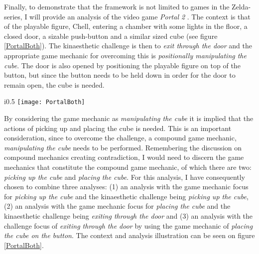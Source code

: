Finally, to demonstrate that the framework is not limited to games in the Zelda-series, I will provide an analysis of the video game \textit{Portal 2} \cite{portaltwo}. The context is that of the playable figure, Chell, entering a chamber with some lights in the floor, a closed door, a sizable push-button and a similar sized cube (see figure \ref{PortalBoth}). The kinaesthetic challenge is then to \textit{exit through the door} and the appropriate game mechanic for overcoming this is \textit{positionally manipulating the cube}. The door is also opened by positioning the playable figure on top of the button, but since the button needs to be held down in order for the door to remain open, the cube is needed.

\begin{wrapfigure}{i}{0.5\textwidth}
  \texttt{[image: PortalBoth]}
  \caption{Damaging the Octorok by swinging the sword in The Legend of Zelda: A Link to the Past as analysed through the game mechanic focus and the challenge focus interpretations combined}
  \label{PortalBoth}
\end{wrapfigure}

By considering the game mechanic as \textit{manipulating the cube} it is implied that the actions of picking up and placing the cube is needed. This is an important consideration, since to overcome the challenge, a compound game mechanic, \textit{manipulating the cube} needs to be performed. Remembering the discussion on compound mechanics creating contradiction, I would need to discern the game mechanics that constitute the compound game mechanic, of which there are two: \textit{picking up the cube} and \textit{placing the cube}. For this analysis, I have consequently chosen to combine three analyses: (1) an analysis with the game mechanic focus for \textit{picking up the cube} and the kinaesthetic challenge being \textit{picking up the cube}, (2) an analysis with the game mechanic focus for \textit{placing the cube} and the kinaesthetic challenge being \textit{exiting through the door} and (3) an analysis with the challenge focus of \textit{exiting through the door} by using the game mechanic of \textit{placing the cube on the button}. The context and analysis illustration can be seen on figure \ref{PortalBoth}.

